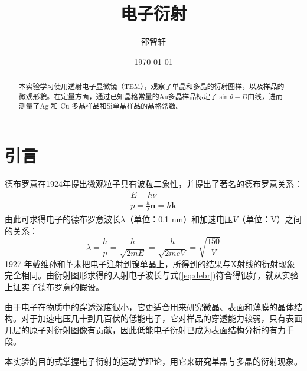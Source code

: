 \documentclass[aps,pre,12pt,preprint,onecolumn,showpacs,showkeys]{revtex4-1}
\begin{document}
\title{\bf\heiti{}电子衍射\vspace{15mm}}
\author{\fangsong{}邵智轩\vspace{2mm}}
\date{\today}

\begin{abstract}
\vspace{10mm}
\begin{spacing}{1.5}
\songti{}
    本实验学习使用透射电子显微镜（TEM），观察了单晶和多晶的衍射图样，以及样品的微观形貌。在定量方面，通过已知晶格常量的Au多晶样品标定了$\sin \theta - D$曲线，进而测量了Ag 和 Cu 多晶样品和Si单晶样品的晶格常数。

\end{spacing}
\end{abstract}
\maketitle
\songti{}

\section{引言}
    德布罗意在1924年提出微观粒子具有波粒二象性，并提出了著名的德布罗意关系：
    \begin{eqnarray}
        E=h\nu\\
        p=\frac{h}{\lambda}\bm{n}=h\bm{k}
    \end{eqnarray}
    由此可求得电子的德布罗意波长$\lambda$（单位：0.1 nm）和加速电压$V$（单位：V）之间的关系：
    \begin{equation}\label{eq:debr}
        \lambda=\frac{h}{p}=\frac{h}{\sqrt{2 m E}}=\frac{h}{\sqrt{2 m e V}}=\sqrt{\frac{150}{V}}
    \end{equation}
    1927 年戴维孙和革末把电子注射到镍单晶上，所得到的结果与X射线的衍射现象完全相同。由衍射图形求得的入射电子波长与式(\ref{eq:debr})符合得很好，就从实验上证实了德布罗意的假设。

    由于电子在物质中的穿透深度很小，它更适合用来研究微晶、表面和薄膜的晶体结构。对于加速电压几十到几百伏的低能电子，它对样品的穿透能力较弱，只有表面几层的原子对衍射图像有贡献，因此低能电子衍射已成为表面结构分析的有力手段。

    本实验的目的式掌握电子衍射的运动学理论，用它来研究单晶与多晶的衍射现象。
\end{document}
